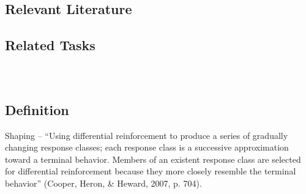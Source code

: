 \subsection{Relevant Literature}
\begin{refsection}
\nocite{test,alang2017police,clayton2018black}
\printbibliography[heading=none]
\end{refsection}
%
\subsection{Related Tasks}
\fourdFour{}\\
%
%
%
%
\section{\fourdFive{}}
\subsection{Definition}
Shaping – ``Using differential reinforcement to produce a series of gradually changing response classes; each response class is a successive approximation toward a terminal behavior.  Members of an existent response class are selected for differential reinforcement because they more closely resemble the terminal behavior'' (Cooper, Heron, \& Heward, 2007, p. 704).
% 
